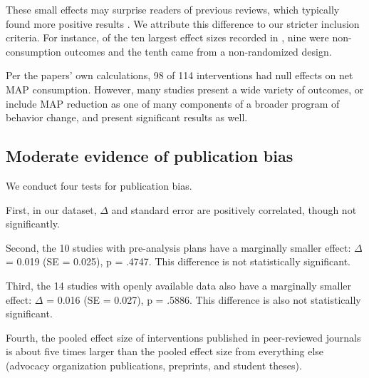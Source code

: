 \documentclass[sn-nature,pdflatex]{sn-jnl}
\begin{document}
These small effects may surprise readers of previous reviews, which
typically found more positive results
\citep{mathur2021meta, meier2022, mertens2022}. We attribute this
difference to our stricter inclusion criteria. For instance, of the ten
largest effect sizes recorded in \citep{mathur2021effectiveness}, nine
were non-consumption outcomes and the tenth came from a non-randomized
design.

Per the papers' own calculations, 98 of 114 interventions had null
effects on net MAP consumption. However, many studies present a wide
variety of outcomes, or include MAP reduction as one of many components
of a broader program of behavior change, and present significant results
as well.

\begin{comment}
Using our calculations of effect size and standard error 15 interventions have 95%
\end{comment}

\subsection{Moderate evidence of publication bias}\label{sec2.2}

We conduct four tests for publication bias.

\begin{comment} 
introductory remarks about how this puts our main results in one light or another? 
\end{comment}

First, in our dataset, \(\Delta\) and standard error are positively
correlated, though not significantly.

Second, the 10 studies with pre-analysis plans have a marginally smaller
effect: \(\Delta\) = 0.019 (SE = 0.025), p = .4747. This difference is
not statistically significant.

Third, the 14 studies with openly available data also have a marginally
smaller effect: \(\Delta\) = 0.016 (SE = 0.027), p = .5886. This
difference is also not statistically significant.

Fourth, the pooled effect size of interventions published in
peer-reviewed journals is about five times larger than the pooled effect
size from everything else (advocacy organization publications,
preprints, and student theses).
\end{document}

